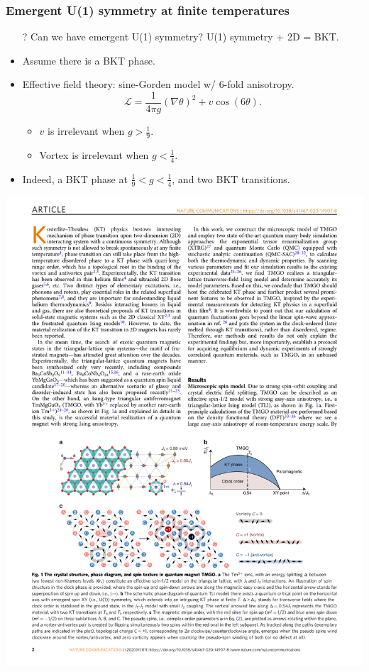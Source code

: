 \documentclass[xcolor=table, aspectratio=1610,ignorenonframetext]{beamer}
\begin{document}
\begin{frame}
  \frametitle{Emergent U(1) symmetry at finite temperatures}
  \begin{itemize}
    \item[?] Can we have emergent U(1) symmetry? U(1) symmetry + 2D = BKT.
    \item \alert{Assume} there is a BKT phase.
    \item Effective field theory: sine-Gorden model w/ 6-fold anisotropy.
    \[\mathcal L = \frac1{4\pi g}(\nabla\theta)^2 + v\cos(6\theta).\]
    \begin{itemize}
      \item $v$ is irrelevant when $g>\frac19$.
      \item Vortex is irrelevant when $g < \frac14$.
    \end{itemize}
    \item Indeed, a BKT phase at $\frac19<g<\frac14$, and two BKT transitions.
  \end{itemize}
  \begin{center}
    \includegraphics{phase-diagram}
  \end{center}
\end{frame}
\end{document}
